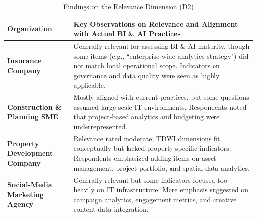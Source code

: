 \documentclass[conference]{IEEEtran}
\begin{document}
\begin{table}[t]
\centering
\caption{Findings on the Relevance Dimension (D2)}
\label{tab:d2_relevance}
\renewcommand{\arraystretch}{1.2}
\begin{tabular}{p{.16\linewidth} p{.74\linewidth}}
\hline
\textbf{Organization} & \textbf{Key Observations on Relevance and Alignment with Actual BI \& AI Practices} \\ \hline

\textbf{Insurance Company} & 
Generally relevant for assessing BI \& AI maturity, though some items (e.g., ``enterprise-wide analytics strategy") did not match local operational scope.  
Indicators on governance and data quality were seen as highly applicable.  \\ \hline

\textbf{Construction \& Planning SME} & 
Mostly aligned with current practices, but some questions assumed large-scale IT environments.  
Respondents noted that project-based analytics and budgeting were underrepresented. \\ \hline

\textbf{Property Development Company} & 
Relevance rated moderate; TDWI dimensions fit conceptually but lacked property-specific indicators.  
Respondents emphasized adding items on asset management, project portfolio, and spatial data analytics.  \\ \hline

\textbf{Social-Media Marketing Agency} & 
Generally relevant but some indicators focused too heavily on IT infrastructure.  
More emphasis suggested on campaign analytics, engagement metrics, and creative content data integration.  \\ \hline
\end{tabular}
\end{table}
\end{document}
